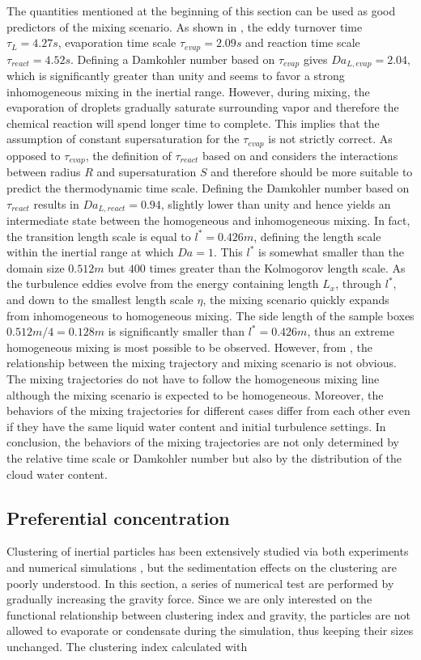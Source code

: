 The quantities mentioned at the beginning of this section can be used as good
predictors of the mixing scenario. As shown in , the eddy
turnover time $\tau_L = 4.27s$, evaporation time scale $\tau_{evap} = 2.09s$
and reaction time scale $\tau_{react} = 4.52s$. Defining a Damkohler number
based on $\tau_{evap}$ gives $Da_{L,evap} = 2.04$, which is significantly
greater than unity and seems to favor a strong inhomogeneous mixing in the
inertial range. However, during mixing, the evaporation of droplets gradually
saturate surrounding vapor and therefore the chemical reaction will spend
longer time to complete. This implies that the assumption of constant
supersaturation for the $\tau_{evap}$ is not strictly correct.  As opposed to
$\tau_{evap}$, the definition of $\tau_{react}$ based on  and
 considers the interactions between radius $R$ and
supersaturation $S$ and therefore should be more suitable to predict the
thermodynamic time scale. Defining the Damkohler number based on $\tau_{react}$
results in $Da_{L,react} = 0.94$, slightly lower than unity and hence yields an
intermediate state between the homogeneous and inhomogeneous mixing. In fact,
the transition length scale is equal to $l^{*} = 0.426m$, defining the length
scale within the inertial range at which $Da = 1$. This $l^*$ is somewhat
smaller than the domain size $0.512m$ but $400$ times greater than the
Kolmogorov length scale. As the turbulence eddies evolve from the energy
containing length $L_x$, through $l^*$, and down to the smallest length scale
$\eta$, the mixing scenario quickly expands from inhomogeneous to homogeneous
mixing. The side length of the sample boxes $0.512m/4 = 0.128 m$ is
significantly smaller than $l^* = 0.426m$, thus an extreme homogeneous mixing
is most possible to be observed. However, from , the
relationship between the mixing trajectory and mixing scenario is not obvious.
The mixing trajectories do not have to follow the homogeneous mixing line
although the mixing scenario is expected to be homogeneous. Moreover, the
behaviors of the mixing trajectories for different cases differ from each other
even if they have the same liquid water content and initial turbulence
settings. In conclusion, the behaviors of the mixing trajectories are not only
determined by the relative time scale or Damkohler number but also by the
distribution of the cloud water content.

\subsection{Preferential concentration}
Clustering of inertial particles has been extensively studied via both
experiments and numerical simulations \cite{Sundaram97, Reade2000}, but the
sedimentation effects on the clustering are poorly understood. In this section,
a series of numerical test are performed by gradually increasing the gravity
force. Since we are only interested on the functional relationship between
clustering index and gravity, the particles are not allowed to evaporate or
condensate during the simulation, thus keeping their sizes unchanged.  The
clustering index calculated with \cite{Vaillancourt02}


